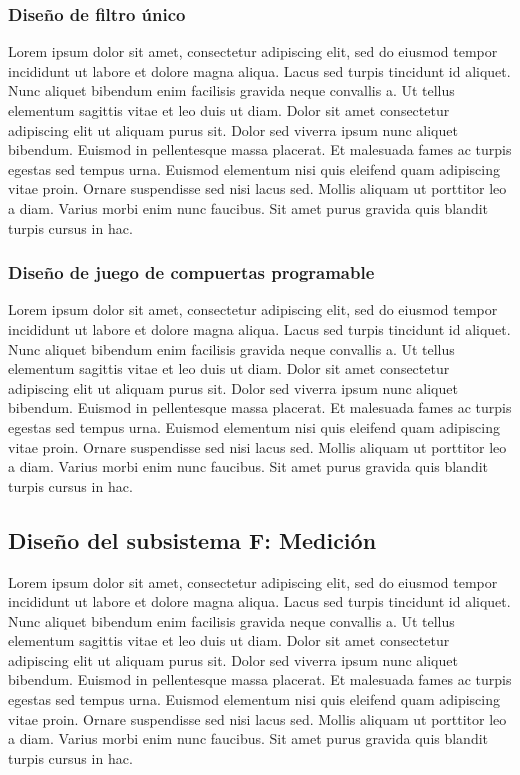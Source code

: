 \subsubsection{Diseño de filtro único} %

Lorem ipsum dolor sit amet, consectetur adipiscing elit, sed do eiusmod tempor incididunt ut labore et dolore magna aliqua. Lacus sed turpis tincidunt id aliquet. Nunc aliquet bibendum enim facilisis gravida neque convallis a. Ut tellus elementum sagittis vitae et leo duis ut diam. Dolor sit amet consectetur adipiscing elit ut aliquam purus sit. Dolor sed viverra ipsum nunc aliquet bibendum. Euismod in pellentesque massa placerat. Et malesuada fames ac turpis egestas sed tempus urna. Euismod elementum nisi quis eleifend quam adipiscing vitae proin. Ornare suspendisse sed nisi lacus sed. Mollis aliquam ut porttitor leo a diam. Varius morbi enim nunc faucibus. Sit amet purus gravida quis blandit turpis cursus in hac.

\subsubsection{Diseño de juego de compuertas programable} 

Lorem ipsum dolor sit amet, consectetur adipiscing elit, sed do eiusmod tempor incididunt ut labore et dolore magna aliqua. Lacus sed turpis tincidunt id aliquet. Nunc aliquet bibendum enim facilisis gravida neque convallis a. Ut tellus elementum sagittis vitae et leo duis ut diam. Dolor sit amet consectetur adipiscing elit ut aliquam purus sit. Dolor sed viverra ipsum nunc aliquet bibendum. Euismod in pellentesque massa placerat. Et malesuada fames ac turpis egestas sed tempus urna. Euismod elementum nisi quis eleifend quam adipiscing vitae proin. Ornare suspendisse sed nisi lacus sed. Mollis aliquam ut porttitor leo a diam. Varius morbi enim nunc faucibus. Sit amet purus gravida quis blandit turpis cursus in hac.

\subsection{Diseño del subsistema F: Medición}

Lorem ipsum dolor sit amet, consectetur adipiscing elit, sed do eiusmod tempor incididunt ut labore et dolore magna aliqua. Lacus sed turpis tincidunt id aliquet. Nunc aliquet bibendum enim facilisis gravida neque convallis a. Ut tellus elementum sagittis vitae et leo duis ut diam. Dolor sit amet consectetur adipiscing elit ut aliquam purus sit. Dolor sed viverra ipsum nunc aliquet bibendum. Euismod in pellentesque massa placerat. Et malesuada fames ac turpis egestas sed tempus urna. Euismod elementum nisi quis eleifend quam adipiscing vitae proin. Ornare suspendisse sed nisi lacus sed. Mollis aliquam ut porttitor leo a diam. Varius morbi enim nunc faucibus. Sit amet purus gravida quis blandit turpis cursus in hac.

